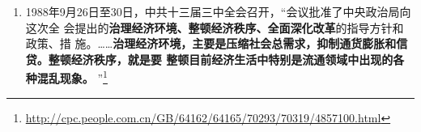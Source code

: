 \begin{enumerate}
\begin{quotation}
    新的经济运行机制，总体上来说应当是“\textbf{国家调节市场，市场引导企业}”的机制。
    国家运用经济手段、法律手段和必要的行政手段，调节市场供求关系，创造适宜的
    经济和社会环境，以此引导企业正确地进行经营决策。
  \end{quotation}

  据赵紫阳回忆，他作报告时，陈云中途退席。严立贤就此报告中的“\textbf{政府调控市场，市
    场引导企业}”写到
  \begin{quotation}
    在十二届三中全会，只是强调国家计划必须依据价值规律，而在这里，\textbf{国家计
      划必须通过市场来实现}，也即只能通过市场把企业引导到国家计划上来。这
    样，\textbf{指令性计划必然要退居次要位置}，整个经济体制因此向市场经济迈进了一
    大步。
    \footnote{\url{http://jds.cass.cn/ztyj/jjs/201605/t20160506_3324987.shtml}}
  \end{quotation}

  在马克思所作的科学共产主义重要纲领性文献《哥达纲领批判》中，将共产主义分为
  共产主义初级阶段（即社会主义）和共产主义高级阶段，初级阶段是向高级阶段的过
  渡期。“社会主义初级阶段”其实并不如报告中所说“已经进入社会主义社会”。它
  不是“共产主义初级阶段”——社会主义，而是相较社会主义阶段带有更多更多资产
  阶级法权的“前社会主义阶段”或“后资本主义阶段”。

  事实上，不管苏联或者中国如何左或如何宣称，都始终都未曾脱离国家资本主义为主
  体的范畴，列宁在战时共产主义失败后对此具有较为清醒认识。在社会主义国家阵营
  的实践中，马恩历史唯物主义中所说的\textbf{“物质生活条件、生产关系和交换关系的发展
  程度”确实是无法跨越的卡夫丁峡谷。}

  赵紫阳本次大会报告上提出\textbf{“一个中心”——以经济建设为中心，将坚持四项基本原
  则和坚持改革开放列为两个基本点。} 据赵紫阳《改革历程》记载，邓力群、胡乔木、
  王忍之等保守派在中共十三大之前对“一个中心，两个基本点”意见较大，他们认为
  应当坚持“四项基本原则为纲，改革开放为目”。此时自由派居保守派上风。


\item 1988年9月26日至30日，中共十三届三中全会召开，“会议批准了中央政治局向这次全
  会提出的\textbf{治理经济环境、整顿经济秩序、全面深化改革}的指导方针和政策、措
  施。……\textbf{治理经济环境，主要是压缩社会总需求，抑制通货膨胀和信贷。整顿经济秩序，就是要
  整顿目前经济生活中特别是流通领域中出现的各种混乱现象。}
  ”\footnote{\url{http://cpc.people.com.cn/GB/64162/64165/70293/70319/4857100.html}}


\end{enumerate}
